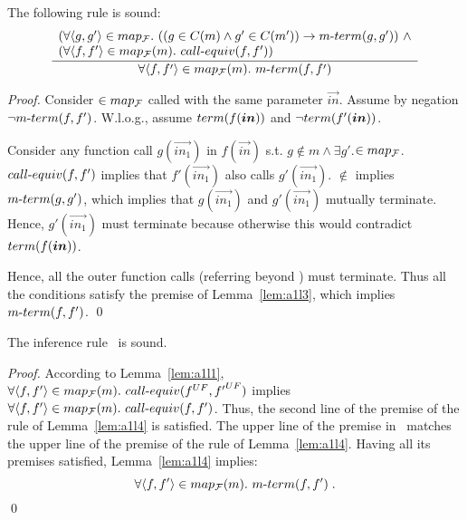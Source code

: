 \begin{lemma}\label{lem:a1l4}
The following rule is sound:
\[
\frac
{\begin{array}{l}
(\forall{\langle g,g'\rangle} \in map_{\cal F}.\ (\left(g \in C(m) \land g' \in C(m')\right) \rightarrow m\mbox{-}term{(g, g'}))\ \land \\
(\forall {\langle f,f'\rangle} \in map_{\cal F}(m).\ call\mbox{-}equiv{(f, f'}))
\end{array}
}
{\forall {\langle f,f'\rangle} \in map_{\cal F}(m).\  m\mbox{-}term{(f, f'})}
\]
\end{lemma}

\begin{proof}Consider $ \in map_{\cal F}$ called with the same parameter
$\vec{in}$. Assume by negation $\lnot m\mbox{-}term{(f, f'})$. W.l.o.g., assume $\term{f(\vec{in})}$
 and  $\lnot\term{f'(\vec{in})}$.

Consider any function call $g(\vec{in_1})$ in $f(\vec{in})$  s.t. $g \notin m \land \exists{g'}. $$\in map_{\cal F}$.
$call\mbox{-}equiv{(f, f'})$ implies that $f'(\vec{in_1})$ also calls $g'(\vec{in_1})$.
$\notin$ implies $m\mbox{-}term{(g, g'})$, which implies that $g(\vec{in_1})$ and $g'(\vec{in_1})$ mutually terminate.%
Hence, $g'(\vec{in_1})$ must terminate because otherwise this would contradict $\term{f(\vec{in})}$.

Hence, all the outer function calls (referring beyond ) must terminate. Thus all the conditions satisfy the premise of Lemma~\ref{lem:a1l3}, which implies $m\mbox{-}term{(f, f'})$.
\qed
\end{proof}


\begin{theorem}
The inference rule\mbox{\ \mtermdp} is sound.
\end{theorem}
\begin{proof}
According to Lemma~\ref{lem:a1l1}, $\forall {\pairwtag{f}} \in\mapf(m).\ \requiv(\upbody{f},\upbody{f'})$ implies $\forall {\pairwtag{f}} \in\mapf(m).\ \requivpair{f}$. Thus, the second line of the premise of the rule of Lemma~\ref{lem:a1l4} is satisfied. The upper line of the premise in\mbox{\ \mtermdp} matches the upper line of the premise of the rule of Lemma~\ref{lem:a1l4}. Having all its premises satisfied, Lemma~\ref{lem:a1l4} implies: \[\forall {\langle f,f'\rangle} \in map_{\cal F}(m).\  m\mbox{-}term{(f, f'})\;.\]
\qed
\end{proof}


